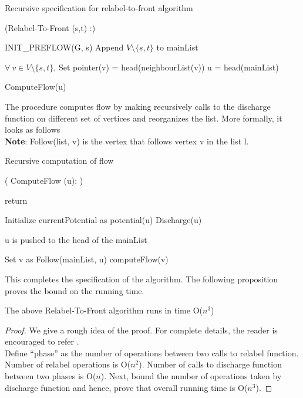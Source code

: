 \documentclass[BTech]{iitmdiss}
\begin{document}
	      \begin{algorithm}[H]
		\caption{Recursive specification for relabel-to-front algorithm}
		\Begin(Relabel-To-Front {(s,t)} :){
		    INIT\_PREFLOW(G, s) \;
		    Append $V \setminus \{s,t\}$ to mainList \;
		    
		    $\forall~v \in V \setminus \{s,t\}$, Set pointer(v) = head(neighbourList(v)) \;
		    u = head(mainList) \;
		    
		    ComputeFlow(u) \;
		}
	       
	      \end{algorithm}
	      The procedure computes flow by making recursively calls to the discharge function on different set of vertices and reorganizes the list. More formally,
	      it looks as follows \\
	      
	      \textbf{Note}: Follow(list, v) is the vertex that follows vertex v in the list l. \\
	      
	      \begin{algorithm}
	       \caption{Recursive computation of flow}
	       \Begin( ComputeFlow {(u)}: )
	       {
		  {
		      return \;
		  }
		  
		  Initialize currentPotential as potential(u) \;
		  Discharge(u) \;
		  {
		      u is pushed to the head of the mainList \;
		  
		  }
		  
		  Set v as Follow(mainList, u) \;
		  computeFlow(v) \;
	       
	       }
	       
	      \end{algorithm}
	      
	      This completes the specification of the algorithm. The following proposition proves the bound on the running time.
	      
	      \begin{prop}
	       The above Relabel-To-Front algorithm runs in time O($n^3$)
	      \end{prop}
	      
	      \begin{proof}
		We give a rough idea of the proof. For complete details, the reader is encouraged to refer \cite{clrs}.\\
		
		Define ``phase'' as the number of operations between two calls to relabel function. Number of relabel operations is O($n^2$). 
		Number of calls to discharge function between two phases is O($	n$). Next, bound the number of operations taken by discharge function
		and hence, prove that overall running time is O($n^3$).
	       
	      \end{proof}
	      
\end{document}
